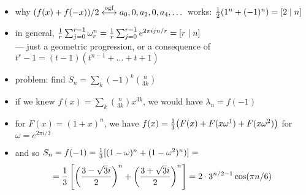 \documentclass[10pt, a4paper]{article}
\newcommand*\ruleline[1]{\par\noindent\raisebox{.8ex}{\makebox[\linewidth]{\hrulefill\hspace{1ex}\raisebox{-.8ex}{#1}\hspace{1ex}\hrulefill}}}
\def\ogf{\overset{{\rm ogf}}{\longleftrightarrow}}
\begin{document}
\ruleline{Every third binomial coefficient [Wilf 51, example 4]}
\begin{itemize}
    \item why $(f(x)+f(-x))/2\ogf a_0, 0, a_2, 0, a_4, \dots$ works: ${1\over 2}(1^n + (-1)^n) = [2\mid n]$
    \item in general, ${1\over r}\sum_{j=0}^{r-1} \omega_r^n = {1\over r}\sum_{j=0}^{r-1} e^{2\pi ijn/r} = [r\mid n]$\\
        --- just a geometric progression, or a consequence of $t^r-1=(t-1)(t^{n-1}+\dots+t+1)$
    \item problem: find $S_n = \sum_k (-1)^k{n\choose 3k}$
    \item if we knew $f(x) = \sum_k {n\choose 3k}x^{3k}$, we would have $\lambda_n = f(-1)$
    \item for $F(x) = (1+x)^n$, we have $f(x) = {1\over 3}\big(F(x) + F(x\omega^1) + F(x\omega^2)\big)$ for $\omega=e^{2\pi i/3}$
    \item and so $S_n=f(-1) ={1\over 3}[(1-\omega)^n + (1-\omega^2)^n)] = $ $$ = {1\over 3}\left[\left({3-\sqrt3 i\over 2}\right)^n+\left({3+\sqrt3 i\over 2}\right)^n\right] = 2\cdot 3^{n/2-1}\cos(\pi n/6)$$
\end{itemize}
\end{document}
